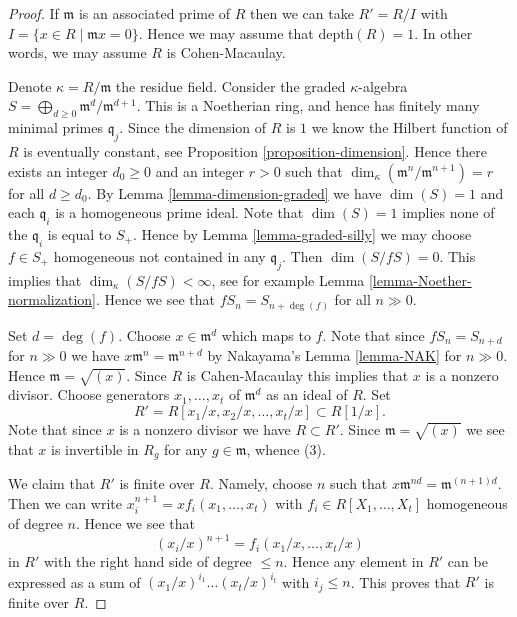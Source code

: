 \begin{proof}
If $\mathfrak m$ is an associated prime of $R$ then we
can take $R' = R/I$ with $I = \{x \in R \mid \mathfrak mx = 0\}$.
Hence we may assume that $\text{depth}(R) = 1$. In other words, we
may assume $R$ is Cohen-Macaulay.

\medskip\noindent
Denote $\kappa = R/\mathfrak m$ the residue field.
Consider the graded $\kappa$-algebra
$S = \bigoplus_{d \geq 0} \mathfrak m^d/\mathfrak m^{d + 1}$.
This is a Noetherian ring, and hence has finitely many
minimal primes $\mathfrak q_j$.
Since the dimension of $R$ is $1$ we know the Hilbert function
of $R$ is eventually constant, see Proposition \ref{proposition-dimension}.
Hence there exists an integer $d_0 \geq 0$ and an integer
$r > 0$ such that $\dim_\kappa(\mathfrak m^n/\mathfrak m^{n + 1}) = r$ for
all $d \geq d_0$.
By Lemma \ref{lemma-dimension-graded} we have $\dim(S) = 1$
and each $\mathfrak q_i$ is a homogeneous prime ideal.
Note that $\dim(S) = 1$ implies
none of the $\mathfrak q_i$ is equal to $S_{+}$.
Hence by Lemma \ref{lemma-graded-silly} we may choose
$f \in S_{+}$ homogeneous not contained in any $\mathfrak q_j$.
Then $\dim(S/fS) = 0$. This implies that $\dim_\kappa(S/fS) < \infty$,
see for example Lemma \ref{lemma-Noether-normalization}.
Hence we see that $fS_n = S_{n + \deg(f)}$ for all $n \gg 0$.

\medskip\noindent
Set $d = \deg(f)$. Choose $x \in \mathfrak m^d$ which maps
to $f$. Note that since $fS_n = S_{n + d}$ for $n \gg 0$ we have
$x\mathfrak m^n = \mathfrak m^{n + d}$ by Nakayama's Lemma \ref{lemma-NAK}
for $n \gg 0$. Hence $\mathfrak m = \sqrt{(x)}$. Since $R$ is
Cahen-Macaulay this implies that $x$ is a nonzero divisor.
Choose generators $x_1, \ldots, x_t$ of $\mathfrak m^d$
as an ideal of $R$. Set
$$
R' = R[x_1/x, x_2/x, \ldots, x_t/x] \subset R[1/x].
$$
Note that since $x$ is a nonzero divisor we have $R \subset R'$.
Since $\mathfrak m = \sqrt{(x)}$ we see that $x$ is invertible in
$R_g$ for any $g \in \mathfrak m$, whence (3).

\medskip\noindent
We claim that $R'$ is finite over $R$. Namely, choose $n$ such that
$x\mathfrak m^{nd} = \mathfrak m^{(n + 1)d}$. Then we can write
$x_i^{n + 1} = xf_i(x_1, \ldots, x_t)$ with $f_i \in R[X_1, \ldots, X_t]$
homogeneous of degree $n$. Hence we see that
$$
(x_i/x)^{n + 1} = f_i(x_1/x, \ldots, x_t/x)
$$
in $R'$ with the right hand side of degree $\leq n$. Hence any
element in $R'$ can be expressed as a sum of
$(x_1/x)^{i_1} \ldots (x_t/x)^{i_t}$ with $i_j \leq n$. This proves
that $R'$ is finite over $R$.


\end{proof}

